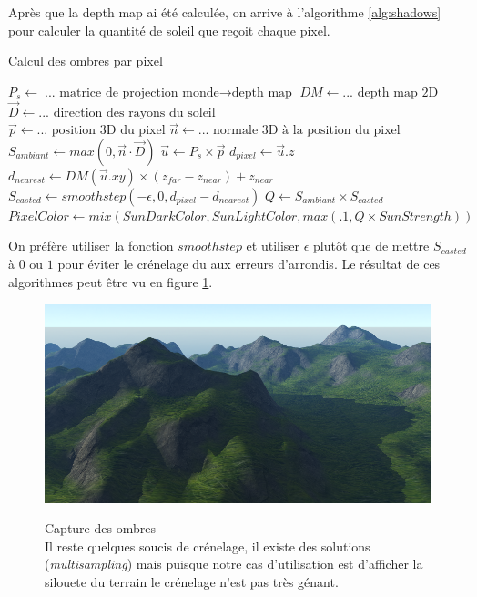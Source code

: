 \documentclass{EPUProjetDi}
\begin{document}
Après que la depth map ai été calculée, on arrive à l'algorithme \ref{alg:shadows} pour calculer la quantité de soleil que reçoit chaque pixel.
\begin{algorithm}
\caption{Calcul des ombres par pixel}
\label{alg:shadows}
\begin{algorithmic}
\State $P_s \gets \text{... matrice de projection monde$\rightarrow$depth map}$
\State $DM \gets \text{... depth map 2D}$
\State $\vec{D} \gets \text{... direction des rayons du soleil}$
\\
\State $\vec{p} \gets \text{...  position 3D du pixel}$
\State $\vec{n} \gets \text{... normale 3D à la position du pixel}$
\\
\State $S_{ambiant} \gets max(0, \vec{n}\cdot \vec{D})$
\State $\vec{u} \gets P_s\times\vec{p}$
\State $d_{pixel} \gets \vec{u}.z$
\State $d_{nearest} \gets DM(\vec{u}.xy)\times(z_{far}-z_{near})+z_{near}$
\State $S_{casted} \gets smoothstep(-\epsilon, 0, d_{pixel}-d_{nearest})$
\State $Q \gets S_{ambiant}\times S_{casted}$
\\
\State $PixelColor\gets mix(SunDarkColor, SunLightColor, max(.1, Q\times SunStrength))$
\end{algorithmic}
\end{algorithm}

On préfère utiliser la fonction $smoothstep$ et utiliser $\epsilon$ plutôt que de mettre $S_{casted}$ à $0$ ou $1$ pour éviter le crénelage du aux erreurs d'arrondis. Le résultat de ces algorithmes peut être vu en figure \ref{fig:shadows}.

\begin{figure}
	\centering
	\caption[Capture des ombres]{Capture des ombres\\Il reste quelques soucis de crénelage, il existe des solutions (\textit{multisampling}) mais puisque notre cas d'utilisation est d'afficher la silouete du terrain le crénelage n'est pas très génant.}
	\includegraphics[scale=.45]{shadows}
	\label{fig:shadows}
	\vspace{-10pt}
\end{figure}
\end{document}
